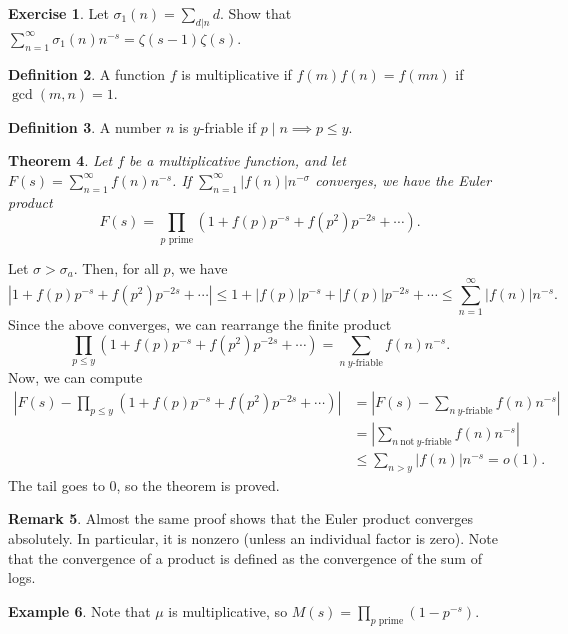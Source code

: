 \documentclass[11pt]{article}
\newtheorem{thm}{Theorem}[section]
\theoremstyle{definition}
\newtheorem{defn}[thm]{Definition}
\newtheorem{example}[thm]{Example}
\newtheorem{exe}[thm]{Exercise}
\newtheorem{remark}[thm]{Remark}
\newcommand{\s}[0]{\sigma}
\newcommand{\abs}[1]{\left\lvert#1\right\rvert} %
\begin{document}
\begin{exe}
Let $\sigma_1(n)=\sum_{d|n}d$. Show that
$\sum_{n=1}^\infty\sigma_1(n)n^{-s}=\zeta(s-1)\zeta(s)$.
\end{exe}

\begin{defn}
A function $f$ is multiplicative if $f(m)f(n)=f(mn)$ if $\gcd(m,n)=1$.
\end{defn}

\begin{defn}
A number $n$ is $y$-friable if $p\mid n \implies p\le y$.
\end{defn}

\begin{thm}
Let $f$ be a multiplicative function, and let $F(s)=\sum_{n=1}^\infty f(n)n^{-s}$. If
$\sum_{n=1}^\infty\abs{f(n)}n^{-\s}$ converges, we have the Euler product
\[
  F(s) = \prod_{p\text{ prime}} (1 + f(p)p^{-s} + f(p^2)p^{-2s} + \cdots) .
\]
\end{thm}
\proof
Let $\s>\s_a$. Then, for all $p$, we have
\[
\abs{1 + f(p)p^{-s} + f(p^2)p^{-2s} + \cdots}
\le 1 + \abs{f(p)}p^{-s} + \abs{f(p)}p^{-2s} + \cdots
\le \sum_{n=1}^\infty \abs{f(n)}n^{-s} .
\]
Since the above converges, we can rearrange the finite product
\[
\prod_{p\le y} (1 + f(p)p^{-s} + f(p^2)p^{-2s} + \cdots)
= \sum_{n~y\text{-friable}} f(n)n^{-s} .
\]
Now, we can compute
\begin{align*}
\abs{F(s) - \prod_{p\le y} (1 + f(p)p^{-s} + f(p^2)p^{-2s} + \cdots)}
&= \abs{F(s) - \sum_{n~y\text{-friable}} f(n)n^{-s}} \\
&= \abs{\sum_{n~\text{not}~y\text{-friable}} f(n)n^{-s}} \\
&\le \sum_{n>y} \abs{f(n)}n^{-s} = o(1) .
\end{align*}
The tail goes to 0, so the theorem is proved.
\qedhere

\begin{remark}
Almost the same proof shows that the Euler product converges absolutely. In particular, it
is nonzero (unless an individual factor is zero). Note that the convergence of a product is
defined as the convergence of the sum of logs.
\end{remark}

\begin{example}
Note that $\mu$ is multiplicative, so $M(s)=\prod_{p\text{ prime}}(1-p^{-s})$.
\end{example}












\end{document}
